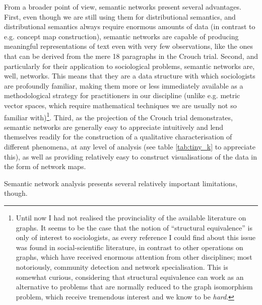 From a broader point of view, semantic networks present several advantages.
First, even though we are still using them for distributional semantics, and distributional semantics always require enormous amounts of data (in contrast to e.g. concept map construction), semantic networks are capable of producing meaningful representations of text even with very few observations, like the ones that can be derived from the mere 18 paragraphs in the Crouch trial.
Second, and particularly for their application to sociological problems, semantic networks are, well, networks.
This means that they are a data structure with which sociologists are profoundly familiar, making them more or less immediately available as a methodological strategy for practitioners in our discipline (unlike e.g. metric vector spaces, which require mathematical techniques we are usually not so familiar with)\footnote{
    Until now I had not realised the provinciality of the available literature on graphs.
    It seems to be the case that the notion of ``structural equivalence'' is only of interest to sociologists, as every reference I could find about this issue was found in social-scientific literature, in contrast to other operations on graphs, which have received enormous attention from other disciplines; most notoriously, community detection and network specialisation.
    This is somewhat curious, considering that structural equivalence can work as an alternative to problems that are normally reduced to the graph isomorphism problem, which receive tremendous interest and we know to be \emph{hard}.
}.
Third, as the projection of the Crouch trial demonstrates, semantic networks are generally easy to appreciate intuitively and lend themselves readily for the construction of a qualitative characterisation of different phenomena, at any level of analysis (see table \autoref{tab:tiny_k} to appreciate this), as well as providing relatively easy to construct visualisations of the data in the form of network maps.

Semantic network analysis presents several relatively important limitations, though.

